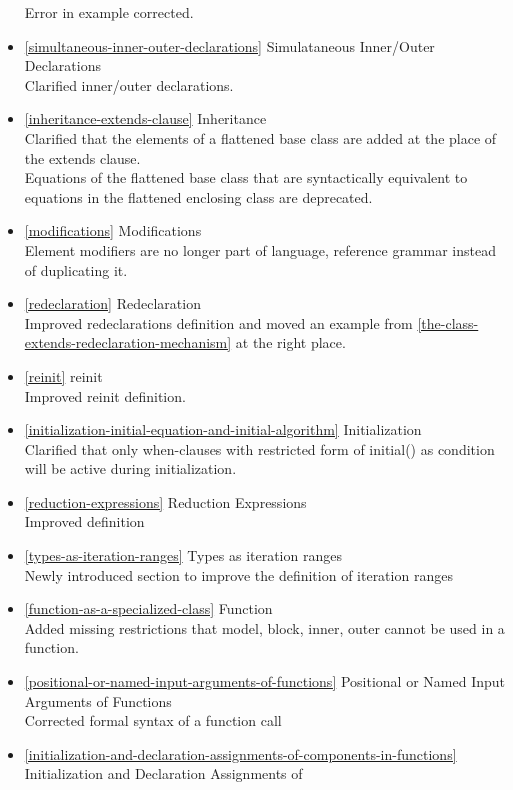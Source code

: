 \begin{itemize}
  Error in example corrected.
\item
  \autoref{simultaneous-inner-outer-declarations} Simulataneous Inner/Outer Declarations\\
  Clarified inner/outer declarations.
\item
  \autoref{inheritance-extends-clause} Inheritance\\
  Clarified that the elements of a flattened base class are added at the
  place of the extends clause.\\
  Equations of the flattened base class that are syntactically
  equivalent to equations in the flattened enclosing class are
  deprecated.
\item
  \autoref{modifications} Modifications\\
  Element modifiers are no longer part of language, reference grammar
  instead of duplicating it.
\item
  \autoref{redeclaration} Redeclaration\\
  Improved redeclarations definition and moved an example from \autoref{the-class-extends-redeclaration-mechanism} at
  the right place.
\item
  \autoref{reinit} reinit\\
  Improved reinit definition.
\item
  \autoref{initialization-initial-equation-and-initial-algorithm} Initialization\\
  Clarified that only when-clauses with restricted form of initial() as
  condition will be active during initialization.
\item
  \autoref{reduction-expressions} Reduction Expressions\\
  Improved definition
\item
  \autoref{types-as-iteration-ranges} Types as iteration ranges\\
  Newly introduced section to improve the definition of iteration ranges
\item
  \autoref{function-as-a-specialized-class} Function\\
  Added missing restrictions that model, block, inner, outer cannot be
  used in a function.
\item
  \autoref{positional-or-named-input-arguments-of-functions} Positional or Named Input Arguments of Functions\\
  Corrected formal syntax of a function call
\item
  \autoref{initialization-and-declaration-assignments-of-components-in-functions} Initialization and Declaration Assignments of

\end{itemize}
